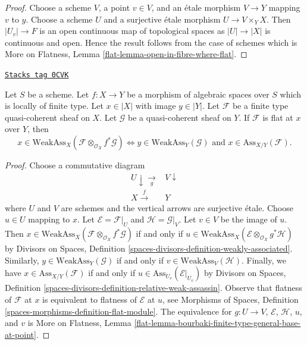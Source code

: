 \begin{proof}
Choose a scheme $V$, a point $v \in V$, and an \'etale morphism $V \to Y$
mapping $v$ to $y$. Choose a scheme $U$ and a surjective \'etale
morphism $U \to V \times_Y X$. Then $|U_v| \to F$ is an open continuous
map of topological spaces as $|U| \to |X|$ is continuous and open.
Hence the result follows from the case of schemes which is
More on Flatness, Lemma \ref{flat-lemma-open-in-fibre-where-flat}.
\end{proof}

\begin{lemma}
\label{spaces-flat-lemma-bourbaki-finite-type-general-base-at-point}
\href{https://stacks.math.columbia.edu/tag/0CVK}{\texttt{Stacks tag 0CVK}}

Let $S$ be a scheme.
Let $f : X \to Y$ be a morphism of algebraic spaces over $S$ which is
locally of finite type. Let $x \in |X|$ with image $y \in |Y|$.
Let $\mathcal{F}$ be a finite type quasi-coherent sheaf on $X$.
Let $\mathcal{G}$ be a quasi-coherent sheaf on $Y$.
If $\mathcal{F}$ is flat at $x$ over $Y$, then
$$
x \in \text{WeakAss}_X(\mathcal{F} \otimes_{\mathcal{O}_X} f^*\mathcal{G})
\Leftrightarrow
y \in \text{WeakAss}_Y(\mathcal{G})
\text{ and }
x \in \text{Ass}_{X/Y}(\mathcal{F}).
$$
\end{lemma}

\begin{proof}
Choose a commutative diagram
$$
\begin{array}{cc}U \downarrow\underset{g}{\longrightarrow} & V \downarrow \\ X \overset{f}{\longrightarrow} & Y\end{array}
$$
where $U$ and $V$ are schemes and the vertical arrows are surjective \'etale.
Choose $u \in U$ mapping to $x$. Let $\mathcal{E} = \mathcal{F}|_U$
and $\mathcal{H} = \mathcal{G}|_V$.
Let $v \in V$ be the image of $u$. Then
$x \in \text{WeakAss}_X(\mathcal{F} \otimes_{\mathcal{O}_X} f^*\mathcal{G})$
if and only if
$u \in \text{WeakAss}_X(\mathcal{E} \otimes_{\mathcal{O}_X} g^*\mathcal{H})$
by Divisors on Spaces, Definition
\ref{spaces-divisors-definition-weakly-associated}.
Similarly, $y \in \text{WeakAss}_Y(\mathcal{G})$ if and only if
$v \in \text{WeakAss}_V(\mathcal{H})$.
Finally, we have $x \in \text{Ass}_{X/Y}(\mathcal{F})$ if and only if
$u \in \text{Ass}_{U_v}(\mathcal{E}|_{U_v})$ by
Divisors on Spaces, Definition
\ref{spaces-divisors-definition-relative-weak-assassin}.
Observe that flatness of $\mathcal{F}$ at $x$ is
equivalent to flatness of $\mathcal{E}$ at $u$, see
Morphisms of Spaces, Definition \ref{spaces-morphisms-definition-flat-module}.
The equivalence for $g : U \to V$, $\mathcal{E}$, $\mathcal{H}$, $u$, and $v$
is More on Flatness, Lemma
\ref{flat-lemma-bourbaki-finite-type-general-base-at-point}.
\end{proof}

